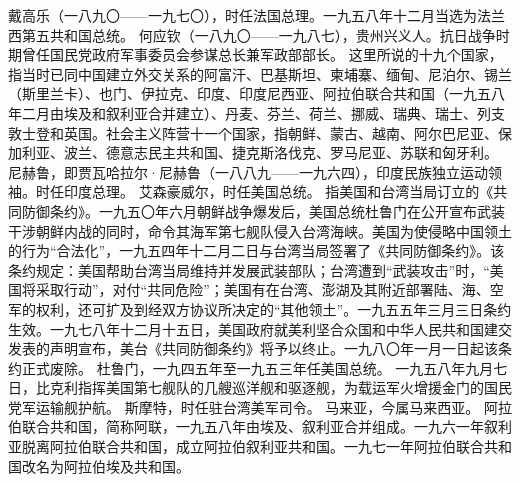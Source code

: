 \begin{maonote}
戴高乐（一八九〇——一九七〇），时任法国总理。一九五八年十二月当选为法兰西第五共和国总统。
何应钦（一八九〇——一九八七），贵州兴义人。抗日战争时期曾任国民党政府军事委员会参谋总长兼军政部部长。
这里所说的十九个国家，指当时已同中国建立外交关系的阿富汗、巴基斯坦、柬埔寨、缅甸、尼泊尔、锡兰（斯里兰卡）、也门、伊拉克、印度、印度尼西亚、阿拉伯联合共和国（一九五八年二月由埃及和叙利亚合并建立）、丹麦、芬兰、荷兰、挪威、瑞典、瑞士、列支敦士登和英国。社会主义阵营十一个国家，指朝鲜、蒙古、越南、阿尔巴尼亚、保加利亚、波兰、德意志民主共和国、捷克斯洛伐克、罗马尼亚、苏联和匈牙利。
尼赫鲁，即贾瓦哈拉尔·尼赫鲁（一八八九——一九六四），印度民族独立运动领袖。时任印度总理。
艾森豪威尔，时任美国总统。
指美国和台湾当局订立的《共同防御条约》。一九五〇年六月朝鲜战争爆发后，美国总统杜鲁门在公开宣布武装干涉朝鲜内战的同时，命令其海军第七舰队侵入台湾海峡。美国为使侵略中国领土的行为“合法化”，一九五四年十二月二日与台湾当局签署了《共同防御条约》。该条约规定：美国帮助台湾当局维持并发展武装部队；台湾遭到“武装攻击”时，“美国将采取行动”，对付“共同危险”；美国有在台湾、澎湖及其附近部署陆、海、空军的权利，还可扩及到经双方协议所决定的“其他领土”。一九五五年三月三日条约生效。一九七八年十二月十五日，美国政府就美利坚合众国和中华人民共和国建交发表的声明宣布，美台《共同防御条约》将予以终止。一九八〇年一月一日起该条约正式废除。
杜鲁门，一九四五年至一九五三年任美国总统。
一九五八年九月七日，比克利指挥美国第七舰队的几艘巡洋舰和驱逐舰，为载运军火增援金门的国民党军运输舰护航。
斯摩特，时任驻台湾美军司令。
马来亚，今属马来西亚。
阿拉伯联合共和国，简称阿联，一九五八年由埃及、叙利亚合并组成。一九六一年叙利亚脱离阿拉伯联合共和国，成立阿拉伯叙利亚共和国。一九七一年阿拉伯联合共和国改名为阿拉伯埃及共和国。
\end{maonote}
